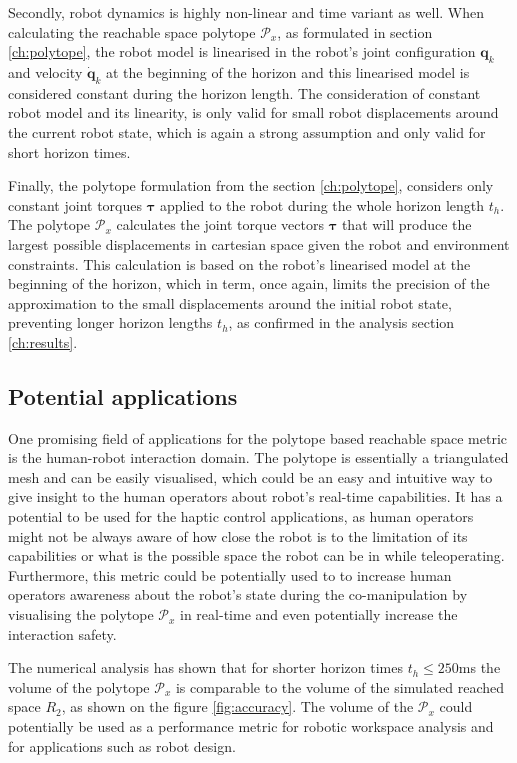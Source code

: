 Secondly, robot dynamics is highly non-linear and time variant as well. When calculating the reachable space polytope $\mathcal{P}_x$, as formulated in section \ref{ch:polytope}, the robot model is linearised in the robot's joint configuration $\bm{q}_k$ and velocity $\dot{\bm{q}}_k$  at the beginning of the horizon and this linearised model is considered constant during the horizon length. The consideration of constant robot model and its linearity, is only valid for small robot displacements around the current robot %
state, which is again a strong assumption and only valid for short horizon times. 

Finally, the polytope formulation from the section \ref{ch:polytope}, considers only constant joint torques $\bm{\tau}$ applied to the robot during the whole horizon length $t_h$. The polytope $\mathcal{P}_x$ calculates the joint torque vectors $\bm{\tau}$ that will produce the largest possible displacements in cartesian space given the robot and environment constraints. This calculation is based on the robot's linearised model at the beginning of the horizon, which in term, once again, limits the precision of the approximation to the small displacements around the initial robot state, preventing longer horizon lengths $t_h$, as confirmed in the analysis section \ref{ch:results}.



\subsection{Potential applications}

One promising field of applications for the polytope based reachable space metric is the human-robot interaction domain. The polytope is essentially a triangulated mesh and can be easily visualised, which could be an easy and intuitive way to give insight to the human operators about robot's real-time capabilities. It has a potential to be used for the haptic control applications, as human operators might not be always aware of how close the robot is to the limitation of its capabilities or what is the possible space the robot can be in while teleoperating. Furthermore, this metric could be potentially used to to increase human operators awareness about the robot's state during the co-manipulation by visualising the polytope $\mathcal{P}_x$ in real-time and even potentially increase the interaction safety. 

The numerical analysis has shown that for shorter horizon times $t_h\leq250$ms the volume of the polytope $\mathcal{P}_x$ is comparable to the volume of the simulated reached space $R_2$, as shown on the figure \ref{fig:accuracy}. The volume of the $\mathcal{P}_x$ could potentially be used as a performance metric for robotic workspace analysis and for applications such as robot design.

